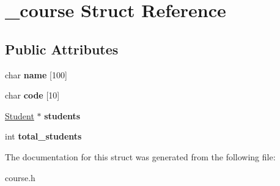 \hypertarget{struct__course}{}\section{\+\_\+course Struct Reference}
\label{struct__course}
\subsection*{Public Attributes}
\begin{DoxyCompactItemize}
\item 
\mbox{\label{struct__course_a8a6f7d2171f18b5d13e86913345f381d}} 
char {\bfseries name} \mbox{[}100\mbox{]}
\item 
\mbox{\label{struct__course_ae86dc46bc4dfe126555e5560860b583f}} 
char {\bfseries code} \mbox{[}10\mbox{]}
\item 
\mbox{\label{struct__course_a5cf448bc80f0f8c5f23402db23d41a00}} 
\mbox{\hyperlink{struct__student}{Student}} $\ast$ {\bfseries students}
\item 
\mbox{\label{struct__course_afd5e161f7cf358c13cc8aa868b462006}} 
int {\bfseries total\+\_\+students}
\end{DoxyCompactItemize}


The documentation for this struct was generated from the following file\+:\begin{DoxyCompactItemize}
\item 
course.\+h\end{DoxyCompactItemize}
